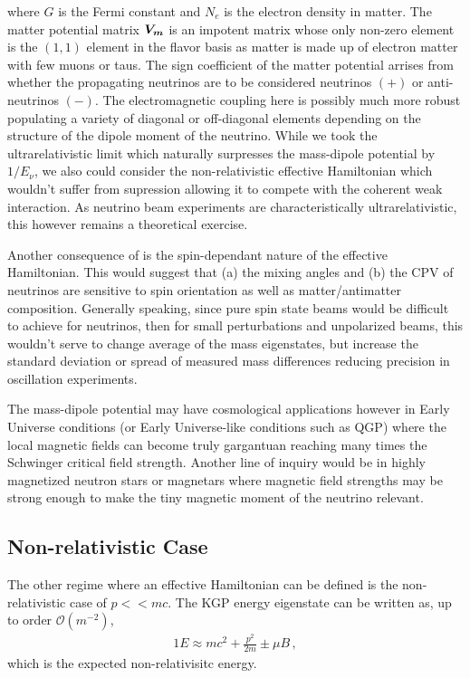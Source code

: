 where $G$ is the Fermi constant and $N_{e}$ is the electron density in matter. The matter potential matrix $\boldsymbol{V_{m}}$ is an impotent matrix whose only non-zero element is the $(1,1)$ element in the flavor basis as matter is made up of electron matter with few muons or taus. \ar The sign coefficient of the matter potential arrises from whether the propagating neutrinos are to be considered neutrinos $(+)$ or anti-neutrinos $(-)$. \ar The electromagnetic coupling here is possibly much more robust populating a variety of diagonal or off-diagonal elements depending on the structure of the dipole moment of the neutrino. While we took the ultrarelativistic limit which naturally surpresses the mass-dipole potential by $1/E_{\nu}$, we also could consider the non-relativistic effective Hamiltonian which wouldn't suffer from supression allowing it to compete with the coherent weak interaction. As neutrino beam experiments are characteristically ultrarelativistic, this however remains a theoretical exercise. 

Another consequence of  is the spin-dependant nature of the effective Hamiltonian. This would suggest that (a) the mixing angles and (b) the CPV of neutrinos are sensitive to spin orientation as well as matter/antimatter composition. Generally speaking, since pure spin state beams would be difficult to achieve for neutrinos, then for small perturbations and unpolarized beams, this wouldn't serve to change average of the mass eigenstates, but increase the standard deviation or spread of measured mass differences reducing precision in oscillation experiments.

The mass-dipole potential may have cosmological applications however in Early Universe conditions (or Early Universe-like conditions such as QGP) where the local magnetic fields can become truly gargantuan reaching many times the Schwinger critical field strength. \ar Another line of inquiry would be in highly magnetized neutron stars or magnetars \ar where magnetic field strengths may be strong enough to make the tiny magnetic moment of the neutrino relevant.

\subsection{Non-relativistic Case}
\noindent The other regime where an effective Hamiltonian can be defined is the non-relativistic case of $p<<mc$. The KGP energy eigenstate  can be written as, up to order $\mathcal{O}(m^{-2})$,
\begin{alignat}{1}
	\label{nonrel:1} E\approx mc^{2}+\frac{p^{2}}{2m}\pm\mu B\,,
\end{alignat}
which is the expected non-relativisitc energy.


